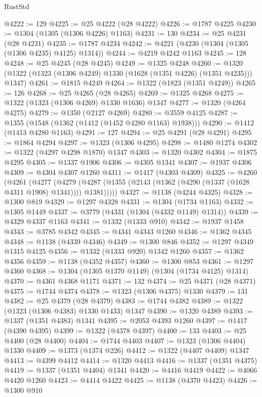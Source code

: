 \begin{lexlean}{RustStd}
\begin{coremodule}
@4222 := 129
@4225 := @25 @4222 (@28 @4222)
@4226 := @1787 @4225
@4230 := @1304 (@1305 (@1306 @4226) @1163)
@4231 := 130
@4234 := @25 @4231 (@28 @4231)
@4235 := @1787 @4234
@4242 := @4221 (@4230 (@1304 (@1305 (@1306 @4235) @4125) @1314))
@4244 := @4219 @4242 @1163
@4245 := 128
@4248 := @25 @4245 (@28 @4245)
@4249 := @1325 @4248
@4260 := @1320 (@1322 (@1323 (@1306 @4249) @1330 (@1628 (@1351 @4226) (@1351 @4235))) @1347)
@4261 := @1815 @4249
@4264 := @1322 (@1823 (@1351 @4249))
@4265 := 126
@4268 := @25 @4265 (@28 @4265)
@4269 := @1325 @4268
@4275 := @1322 (@1323 (@1306 @4269) @1330 @1636) @1347
@4277 := @1320 (@4264 @4275)
@4279 := @1350 (@2127 @4269)
@4280 := @3559 @4125
@4287 := @1355 (@1548 (@1362 (@1412 (@1452 @4280 @1163) @1938)))
@4290 := @1412 (@1413 @4280 @1163)
@4291 := 127
@4294 := @25 @4291 (@28 @4291)
@4295 := @1864 @4294
@4297 := @1323 (@1306 @4295)
@4298 := @1480 @1274
@4302 := @1322 (@4297 @4298 @1870) @1347
@4303 := @1320 @4302
@4304 := @1875 @4295
@4305 := @1337 @1906
@4306 := @4305 @1341
@4307 := @1937 @4306
@4309 := @4304 @4307 @1260
@4311 := @1417 (@4303 @4309)
@4325 := @4260
    (@4261
      (@4277
        (@4279 (@4287 (@1355 (@2143 (@1362 (@4290 (@1337 (@1628 @4311 @1908) @1341)))) @1381)))))
@4327 := @1138 (@4244 @4325)
@4328 := @1300 @819
@4329 := @1297 @4328
@4331 := @1304 (@1734 @1163)
@4332 := @1305 @1449
@4337 := @3779 (@4331 (@1304 (@4332 @1149) @1314))
@4339 := @4329 @4337 @1163
@4341 := @1332 (@1333 @910)
@4342 := @1937 @1458
@4343 := @3785 @4342
@4345 := @4341 @4343 @1260
@4346 := @1362 @4345
@4348 := @1138 (@4339 @4346)
@4349 := @1300 @846
@4352 := @1297 @4349 @1315 @4125
@4356 := @1332 (@1333 @920) @1342 @1260
@4357 := @1362 @4356
@4359 := @1138 (@4352 @4357)
@4360 := @1300 @853
@4361 := @1297 @4360
@4368 := @1304 (@1305 @1370 @1149) (@1304 (@1734 @4125) @1314)
@4370 := @4361 @4368 @1171
@4371 := 132
@4374 := @25 @4371 (@28 @4371)
@4375 := @1744 @4374
@4378 := @1323 (@1306 @4375) @1330
@4379 := 131
@4382 := @25 @4379 (@28 @4379)
@4383 := @1744 @4382
@4389 := @1322 (@1323 (@1306 @4383) @1330 @1433) @1347
@4390 := @1320 @4389
@4393 := @1337 (@1351 @4383) @1341
@4395 := @2053 @4393 @1260
@4397 := @1417 (@4390 @4395)
@4399 := @1322 (@4378 @4397)
@4400 := 133
@4403 := @25 @4400 (@28 @4400)
@4404 := @1744 @4403
@4407 := @1323 (@1306 @4404) @1330
@4409 := @1373 (@1374 @226)
@4412 := @1322 (@4407 @4409) @1347
@4413 := @4399 @4412
@4414 := @1320 @4413
@4416 := @1337 (@1351 @4375)
@4419 := @1337 (@1351 @4404) @1341
@4420 := @4416 @4419
@4422 := @4066 @4420 @1260
@4423 := @4414 @4422
@4425 := @1138 (@4370 @4423)
@4426 := @1300 @910

\end{coremodule}
\end{lexlean}

